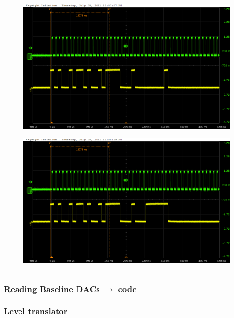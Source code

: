 \documentclass[aspectratio=169]{beamer}
\begin{document}
\begin{frame}
\begin{columns}
		\begin{center}
			\begin{figure}
				\includegraphics[width=0.55 \textwidth]{IMG/probe/09-08-2021_ch17-write01-baselinedac1.png}
				\caption{}
			\end{figure}
			\begin{figure}
				\includegraphics[width=0.55 \textwidth]{IMG/probe/09-08-2021_ch17-write63-baselinedac1.png}
				\caption{}
			\end{figure}	
		\end{center}
	\end{columns}
	\end{frame}

	\begin{frame}
	\frametitle{Reading Baseline DACs $\rightarrow$ code}

	\end{frame}

	\begin{frame}
	\frametitle{Level translator}
	
	\end{frame}
\end{document}
